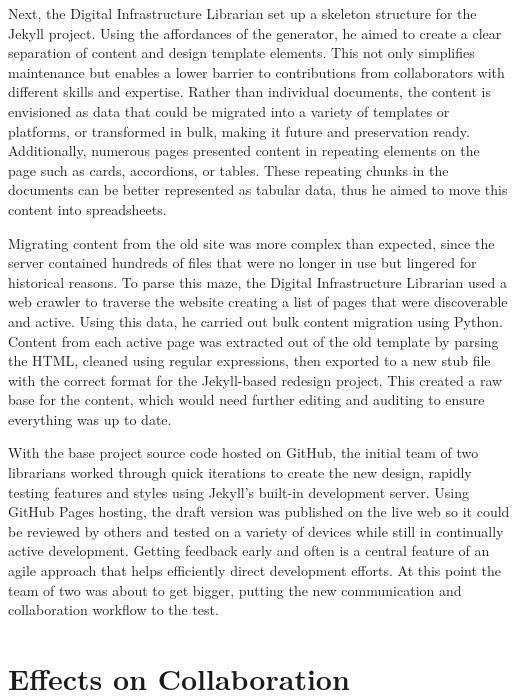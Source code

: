 \documentclass{book}
\begin{document}
Next, the Digital Infrastructure Librarian set up a skeleton structure for the
Jekyll project. Using the affordances of the generator, he aimed to create a
clear separation of content and design template elements. This not only
simplifies maintenance but enables a lower barrier to contributions from
collaborators with different skills and expertise. Rather than individual
documents, the content is envisioned as data that could be migrated into a
variety of templates or platforms, or transformed in bulk, making it future
and preservation ready. Additionally, numerous pages presented content in
repeating elements on the page such as cards, accordions, or tables. These
repeating chunks in the documents can be better represented as tabular data,
thus he aimed to move this content into spreadsheets.

Migrating content from the old site was more complex than expected, since the
server contained hundreds of files that were no longer in use but lingered for
historical reasons. To parse this maze, the Digital Infrastructure Librarian
used a web crawler to traverse the website creating a list of pages that were
discoverable and active. Using this data, he carried out bulk content
migration using Python. Content from each active page was extracted out of the
old template by parsing the HTML, cleaned using regular expressions, then
exported to a new stub file with the correct format for the Jekyll-based
redesign project. This created a raw base for the content, which would need
further editing and auditing to ensure everything was up to date.

With the base project source code hosted on GitHub, the initial team of two
librarians worked through quick iterations to create the new design, rapidly
testing features and styles using Jekyll's built-in development server. Using
GitHub Pages hosting, the draft version was published on the live web so it
could be reviewed by others and tested on a variety of devices while still in
continually active development. Getting feedback early and often is a central
feature of an agile approach that helps efficiently direct development
efforts. At this point the team of two was about to get bigger, putting the
new communication and collaboration workflow to the test.

\hypertarget{effects-on-collaboration}{%
\chapter{Effects on Collaboration}\label{effects-on-collaboration}}
\end{document}
